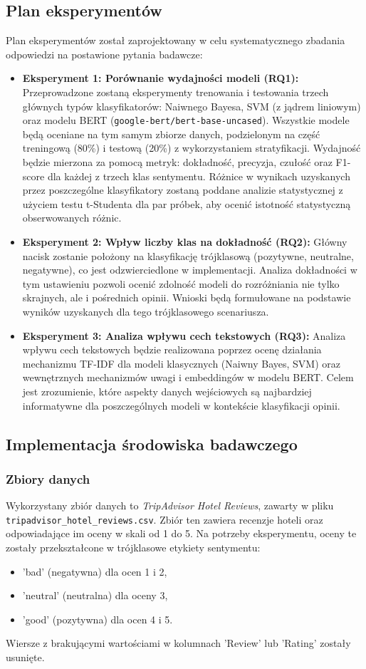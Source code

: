 \documentclass[runningheads]{llncs}
\begin{document}
\subsection{Plan eksperymentów}
Plan eksperymentów został zaprojektowany w celu systematycznego zbadania odpowiedzi na postawione pytania badawcze:
\begin{itemize}
    \item \textbf{Eksperyment 1: Porównanie wydajności modeli (RQ1):} Przeprowadzone zostaną eksperymenty trenowania i testowania trzech głównych typów klasyfikatorów: Naiwnego Bayesa, SVM (z jądrem liniowym) oraz modelu BERT (\texttt{google-bert/bert-base-uncased}). Wszystkie modele będą oceniane na tym samym zbiorze danych, podzielonym na część treningową (80\%) i testową (20\%) z wykorzystaniem stratyfikacji. Wydajność będzie mierzona za pomocą metryk: dokładność, precyzja, czułość oraz F1-score dla każdej z trzech klas sentymentu. Różnice w wynikach uzyskanych przez poszczególne klasyfikatory zostaną poddane analizie statystycznej z użyciem testu t-Studenta dla par próbek, aby ocenić istotność statystyczną obserwowanych różnic.
    \item \textbf{Eksperyment 2: Wpływ liczby klas na dokładność (RQ2):} Główny nacisk zostanie położony na klasyfikację trójklasową (pozytywne, neutralne, negatywne), co jest odzwierciedlone w implementacji. Analiza dokładności w tym ustawieniu pozwoli ocenić zdolność modeli do rozróżniania nie tylko skrajnych, ale i pośrednich opinii. Wnioski będą formułowane na podstawie wyników uzyskanych dla tego trójklasowego scenariusza.
    \item \textbf{Eksperyment 3: Analiza wpływu cech tekstowych (RQ3):} Analiza wpływu cech tekstowych będzie realizowana poprzez ocenę działania mechanizmu TF-IDF dla modeli klasycznych (Naiwny Bayes, SVM) oraz wewnętrznych mechanizmów uwagi i embeddingów w modelu BERT. Celem jest zrozumienie, które aspekty danych wejściowych są najbardziej informatywne dla poszczególnych modeli w kontekście klasyfikacji opinii.
\end{itemize}

\subsection{Implementacja środowiska badawczego}

\subsubsection{Zbiory danych}
Wykorzystany zbiór danych to \textit{TripAdvisor Hotel Reviews}, zawarty w pliku \texttt{tripadvisor\_hotel\_reviews.csv}. Zbiór ten zawiera recenzje hoteli oraz odpowiadające im oceny w skali od 1 do 5. Na potrzeby eksperymentu, oceny te zostały przekształcone w trójklasowe etykiety sentymentu:
\begin{itemize}
    \item 'bad' (negatywna) dla ocen 1 i 2,
    \item 'neutral' (neutralna) dla oceny 3,
    \item 'good' (pozytywna) dla ocen 4 i 5.
\end{itemize}
Wiersze z brakującymi wartościami w kolumnach 'Review' lub 'Rating' zostały usunięte.
\end{document}
